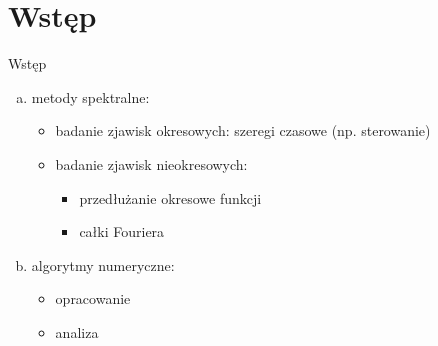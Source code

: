 \section{Wstęp}
\begin{frame}{Wstęp}
	\begin{enumerate}[a)]
		\item metody spektralne:
		\begin{itemize}
			\item badanie zjawisk okresowych: szeregi czasowe (np. sterowanie)
			\item badanie zjawisk nieokresowych:
			\begin{itemize}
				\item przedłużanie okresowe funkcji
				\item całki Fouriera
			\end{itemize}
		\end{itemize}
        \item algorytmy numeryczne:
        \begin{itemize}
        	\item opracowanie
        	\item analiza
        \end{itemize}	
	\end{enumerate}
\end{frame}